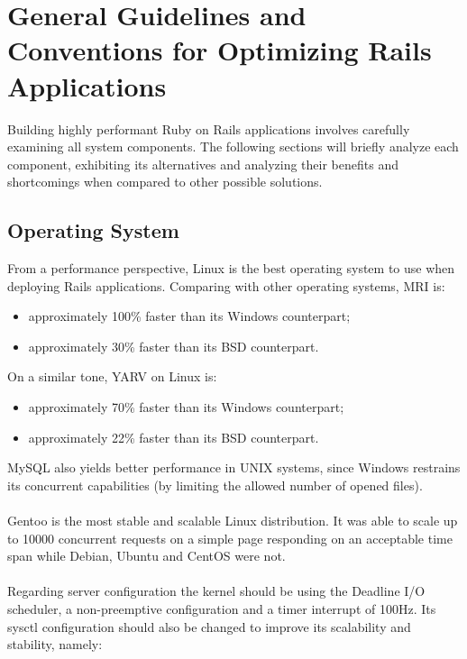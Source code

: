 \chapter{General Guidelines and Conventions for Optimizing Rails Applications} %
\label{ap:scaling_rails}

Building highly performant Ruby on Rails applications involves carefully examining all system components. The following sections will briefly analyze each component, exhibiting its alternatives and analyzing their benefits and shortcomings when compared to other possible solutions.

\section{Operating System}
From a performance perspective, Linux is the best operating system to use when deploying Rails applications. Comparing with other operating systems, MRI is:
\begin{itemize}
  \item approximately 100\% faster than its Windows counterpart;
  \item approximately 30\% faster than its BSD counterpart.
\end{itemize}
On a similar tone, YARV on Linux is:
\begin{itemize}
  \item approximately 70\% faster than its Windows counterpart;
  \item approximately 22\% faster than its BSD counterpart.
\end{itemize}
MySQL also yields better performance in UNIX systems, since Windows restrains its concurrent capabilities (by limiting the allowed number of opened files).\\\\
Gentoo is the most stable and scalable Linux distribution. It was able to scale up to 10000 concurrent requests on a simple page responding on an acceptable time span while Debian, Ubuntu and CentOS were not.\\\\
Regarding server configuration the kernel should be using the Deadline I/O scheduler, a non-preemptive configuration and a timer interrupt of 100Hz. Its sysctl configuration should also be changed to improve its scalability and stability, namely:
